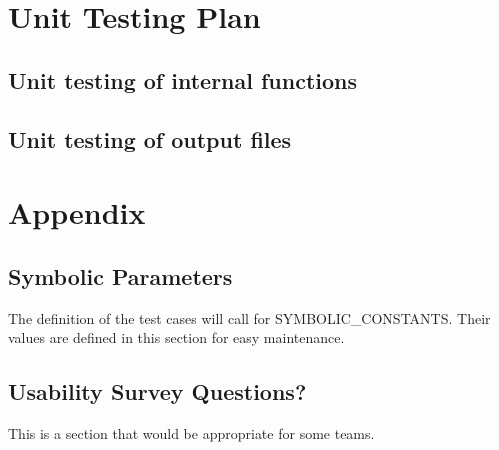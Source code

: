 \documentclass[12pt, titlepage]{article}
\begin{document}
				
\section{Unit Testing Plan}
		
\subsection{Unit testing of internal functions}
		
\subsection{Unit testing of output files}		






\newpage

\section{Appendix}

\subsection{Symbolic Parameters}

The definition of the test cases will call for SYMBOLIC\_CONSTANTS.
Their values are defined in this section for easy maintenance.

\subsection{Usability Survey Questions?}

This is a section that would be appropriate for some teams.
\end{document}
